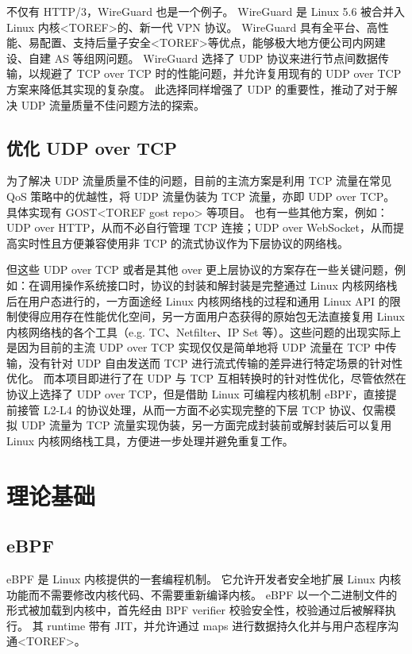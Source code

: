 不仅有 HTTP/3，WireGuard 也是一个例子。
WireGuard 是 Linux 5.6 被合并入 Linux 内核<TOREF>的、新一代 VPN 协议。
WireGuard 具有全平台、高性能、易配置、支持后量子安全<TOREF>等优点，能够极大地方便公司内网建设、自建 AS 等组网问题。
WireGuard 选择了 UDP 协议来进行节点间数据传输，以规避了 TCP over TCP 时的性能问题，并允许复用现有的 UDP over TCP 方案来降低其实现的复杂度。
此选择同样增强了 UDP 的重要性，推动了对于解决 UDP 流量质量不佳问题方法的探索。

\section{优化 UDP over TCP}

为了解决 UDP 流量质量不佳的问题，目前的主流方案是利用 TCP 流量在常见 QoS 策略中的优越性，将 UDP 流量伪装为 TCP 流量，亦即 UDP over TCP。
具体实现有 GOST<TOREF gost repo> 等项目。
也有一些其他方案，例如：UDP over HTTP，从而不必自行管理 TCP 连接；UDP over WebSocket，从而提高实时性且方便兼容使用非 TCP 的流式协议作为下层协议的网络栈。

但这些 UDP over TCP 或者是其他 over 更上层协议的方案存在一些关键问题，例如：在调用操作系统接口时，协议的封装和解封装是完整通过 Linux 内核网络栈后在用户态进行的，一方面途经 Linux 内核网络栈的过程和通用 Linux API 的限制使得应用存在性能优化空间，另一方面用户态获得的原始包无法直接复用 Linux 内核网络栈的各个工具（e.g. TC、Netfilter、IP Set 等）。这些问题的出现实际上是因为目前的主流 UDP over TCP 实现仅仅是简单地将 UDP 流量在 TCP 中传输，没有针对 UDP 自由发送而 TCP 进行流式传输的差异进行特定场景的针对性优化。
而本项目即进行了在 UDP 与 TCP 互相转换时的针对性优化，尽管依然在协议上选择了 UDP over TCP，但是借助 Linux 可编程内核机制 eBPF，直接提前接管 L2-L4 的协议处理，从而一方面不必实现完整的下层 TCP 协议、仅需模拟 UDP 流量为 TCP 流量实现伪装，另一方面完成封装前或解封装后可以复用 Linux 内核网络栈工具，方便进一步处理并避免重复工作。

\chapter{理论基础}

\section{eBPF}

eBPF 是 Linux 内核提供的一套编程机制。
它允许开发者安全地扩展 Linux 内核功能而不需要修改内核代码、不需要重新编译内核。
eBPF 以一个二进制文件的形式被加载到内核中，首先经由 BPF verifier 校验安全性，校验通过后被解释执行。
其 runtime 带有 JIT，并允许通过 maps 进行数据持久化并与用户态程序沟通<TOREF>。

